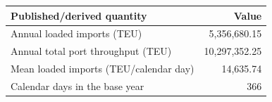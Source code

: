 \begin{tabular}{lr}
\toprule
Published/derived quantity & Value \\
\midrule
Annual loaded imports (TEU) & 5,356,680.15 \\
Annual total port throughput (TEU) & 10,297,352.25 \\
Mean loaded imports (TEU/calendar day) & 14,635.74 \\
Calendar days in the base year & 366 \\
\bottomrule
\end{tabular}
